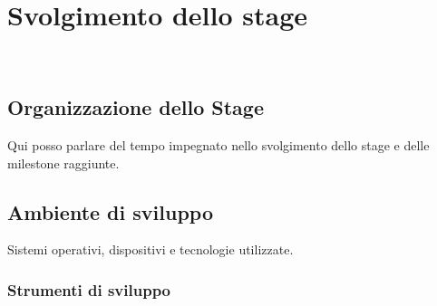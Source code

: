 
\pagebreak
\chapter{Svolgimento dello stage}
\label{cap:descrizione-stage}

\\

\section{Organizzazione dello Stage}

Qui posso parlare del tempo impegnato nello svolgimento dello stage e delle milestone raggiunte.

\section{Ambiente di sviluppo}

Sistemi operativi, dispositivi e tecnologie utilizzate.

\subsection{Strumenti di sviluppo}

%

